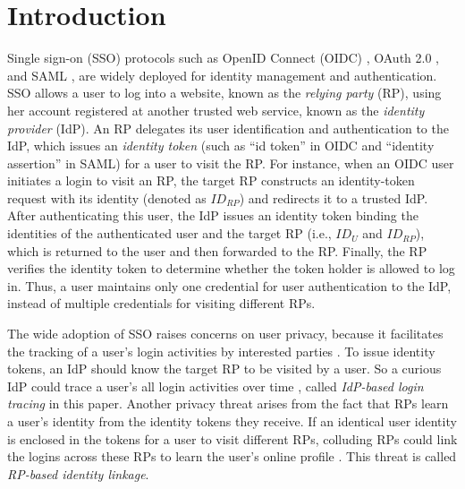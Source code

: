 \section{Introduction}
\label{sec:intro}
Single sign-on (SSO) protocols such as OpenID Connect (OIDC) \cite{OpenIDConnect}, OAuth 2.0 \cite{rfc6749}, and SAML \cite{SAML, SAMLIdentifier}, are widely deployed for identity management and authentication.
SSO allows a user to log into a website,
 known as the \emph{relying party} (RP), using her account registered at another trusted web service, known as the \emph{identity provider} (IdP).
An RP delegates its user identification and authentication to the IdP, which issues an \emph{identity token} (such as ``id token'' in OIDC and ``identity assertion'' in SAML) for a user to visit the RP.
For instance, when an OIDC user initiates a login to visit an RP,
the target RP constructs an identity-token request with its identity (denoted as $ID_{RP}$) and redirects it to a trusted IdP.
After authenticating this user, the IdP issues an identity token binding the identities of the authenticated user and the target RP (i.e., $ID_U$ and $ID_{RP}$), which is returned to the user and then forwarded to the RP.
Finally, the RP verifies the identity token to determine whether the token holder is allowed to log in. Thus, a user maintains only one credential for user authentication to the IdP, instead of multiple credentials for visiting different RPs.


The wide adoption of SSO raises concerns on user privacy, because it facilitates the tracking of a user's login activities by interested parties \cite{NIST2017draft, SPRESSO, BrowserID, maler2008venn}.
To issue identity tokens, an IdP should know the target RP to be visited by a user.
So a curious IdP could trace a user's all login activities over time
 \cite{BrowserID, SPRESSO},
called {\em IdP-based login tracing} in this paper.
Another privacy threat arises from the fact that RPs learn a user's identity from the identity tokens they receive.
If an identical user identity is enclosed in the tokens for a user to visit different RPs, colluding RPs could link the logins across these RPs %
to learn the user's online profile \cite{maler2008venn, FirefoxAccount}.
This threat is called {\em RP-based identity linkage}. %

